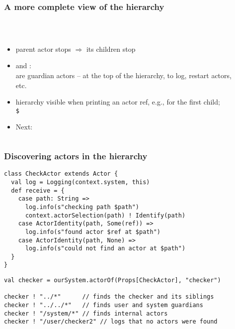 \documentclass[aspectratio=169]{beamer}
\begin{document}
\begin{frame}[fragile]\frametitle{A more complete view of the hierarchy}
~\\[-6mm]
\begin{columns}
\begin{column}{0.57\textwidth}
\begin{itemize}
  \item \alert{parent} actor stops $\Rightarrow$ its \alert{children} stop
  \item {} and :
    \\ are \alert{guardian actors} -- at the top of the hierarchy, to log, restart actors, etc.
  \item hierarchy visible when printing an actor ref, e.g., for the first child;
    \\\texttt{\$}
  \item \pause \alert{Next:}
\end{itemize}
\end{column}
\begin{column}{0.41\textwidth}
  ~\\
\end{column}
\end{columns}
\end{frame}


\begin{frame}[fragile]\frametitle{Discovering actors in the hierarchy}

\begin{lstlisting}[emph={Actor, Logging, Props, ourSystem,terminate,sleep,actorOf,receive,Identify,actorSelection}]
class CheckActor extends Actor {
  val log = Logging(context.system, this)
  def receive = {
    case path: String =>
      log.info(s"checking path $path")
      context.actorSelection(path) ! Identify(path)
    case ActorIdentity(path, Some(ref)) =>
      log.info(s"found actor $ref at $path")
    case ActorIdentity(path, None) =>
      log.info(s"could not find an actor at $path")
  }
}
\end{lstlisting}    

\pause
\begin{lstlisting}[emph={Actor, Logging, Props, ourSystem,terminate,sleep,actorOf,receive,Identify,actorSelection}]
val checker = ourSystem.actorOf(Props[CheckActor], "checker")

checker ! "../*"      // finds the checker and its siblings
checker ! "../../*"   // finds user and system guardians
checker ! "/system/*" // finds internal actors
checker ! "/user/checker2" // logs that no actors were found
\end{lstlisting}
\end{frame}
\end{document}

